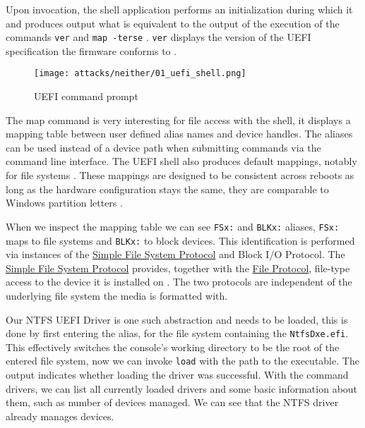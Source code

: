 Upon invocation, the shell application performs an initialization during which it  and produces output what is equivalent to the output of the execution of the commands \lstinline{ver} and \lstinline{map -terse} \cite[3.3 Initialization]{uefi-shell-spec}.
\lstinline{ver} displays the version of the \ac{UEFI} specification the firmware conforms to \cite[5.3 Shell Commands]{uefi-shell-spec}.


\begin{figure}[htb]
    \centering
    \texttt{[image: attacks/neither/01\_uefi\_shell.png]}
    \caption{\ac{UEFI} command prompt}
    \label{fig:uefi-shell}
\end{figure}


The map command is very interesting for file access with the shell, it displays a mapping table between user defined alias names and device handles.
The aliases can be used instead of a device path when submitting commands via the command line interface.
The \ac{UEFI} shell also produces default mappings, notably for file systems \cite[3.7.2. Mappings]{uefi-shell-spec}.
These mappings are designed to be consistent across reboots as long as the hardware configuration stays the same, they are comparable to Windows partition letters \cite[Appendix A]{uefi-shell-spec}.

When we inspect the mapping table we can see \lstinline{FSx:} and \lstinline{BLKx:} aliases, \lstinline{FSx:} maps to file systems and \lstinline{BLKx:} to block devices.
This identification is performed via instances of the \hyperref[lst:simple-filesytem-protocol]{Simple File System Protocol} and  Block \ac{I/O} Protocol.
The \hyperref[lst:simple-filesytem-protocol]{Simple File System Protocol} \cite[13.4]{uefi-spec} provides, together with the \hyperref[lst:file-protocol]{File Protocol}, file-type access to the device it is installed on \cite[13.5]{uefi-spec}.
The two protocols are independent of the underlying file system the media is formatted with.


Our \ac{NTFS} \ac{UEFI} Driver is one such abstraction and needs to be loaded, this is done by first entering the alias, for the file system containing the \lstinline{NtfsDxe.efi}.
This effectively switches the console's working directory to be the root of the entered file system, now we can invoke \lstinline{load} with the path to the executable.
The output indicates whether loading the driver was successful.
With the command drivers, we can list all currently loaded drivers and some basic information about them, such as number of devices managed.
We can see that the NTFS driver already manages devices.

